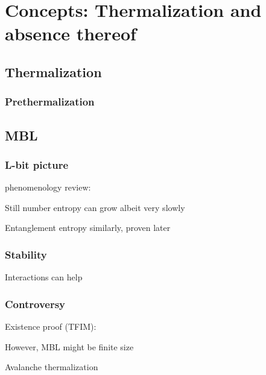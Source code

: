 \chapter{Concepts: Thermalization and absence thereof}\label{ch:another}
\section{Thermalization}

\subsection{Prethermalization}

\section{MBL}
\subsection{L-bit picture}

phenomenology review: \cite{imbrieReviewLocalIntegrals2017}

Still number entropy can grow albeit very slowly\cite{kiefer-emmanouilidisEvidenceUnboundedGrowth2020,chavezUltraslowGrowthNumber2023}

Entanglement entropy similarly\cite{bardarsonUnboundedGrowthEntanglement2012}, proven later\cite{huangExtensiveEntropyUnitary2021}

\subsection{Stability}
Interactions can help\cite{huangInteractionenhancedManybodyLocalization2024}

\subsection{Controversy}
Existence proof (TFIM): \cite{imbrieManyBodyLocalizationQuantum2016}

However, MBL might be finite size

Avalanche thermalization